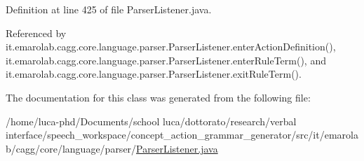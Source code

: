 Definition at line 425 of file Parser\-Listener.\-java.



Referenced by it.\-emarolab.\-cagg.\-core.\-language.\-parser.\-Parser\-Listener.\-enter\-Action\-Definition(), it.\-emarolab.\-cagg.\-core.\-language.\-parser.\-Parser\-Listener.\-enter\-Rule\-Term(), and it.\-emarolab.\-cagg.\-core.\-language.\-parser.\-Parser\-Listener.\-exit\-Rule\-Term().



The documentation for this class was generated from the following file\-:\begin{DoxyCompactItemize}
\item 
/home/luca-\/phd/\-Documents/school luca/dottorato/research/verbal interface/speech\-\_\-workspace/concept\-\_\-action\-\_\-grammar\-\_\-generator/src/it/emarolab/cagg/core/language/parser/\hyperlink{ParserListener_8java}{Parser\-Listener.\-java}\end{DoxyCompactItemize}
